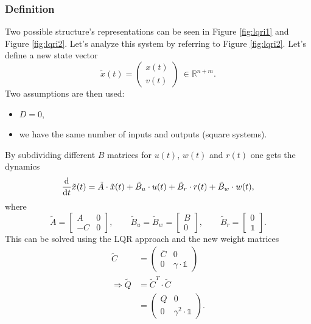 \documentclass[a4paper,12 pt]{article}
\numberwithin{equation}{section}
\theoremstyle{definition}
\theoremstyle{remark}
\theoremstyle{definition}
\theoremstyle{definition}
\theoremstyle{definition}
\theoremstyle{remark}
\begin{document}
\subsubsection*{Definition} Two possible structure's representations can be seen in Figure \ref{fig:lqri1} and Figure \ref{fig:lqri2}. Let's analyze this system by referring to Figure \ref{fig:lqri2}. Let's define a new state vector 
\begin{equation}
\tilde{x}(t)=\begin{pmatrix} x(t) \\ v(t) \end{pmatrix} \ \in \mathbb{R}^{n+m}.
\end{equation}
Two assumptions are then used:
\begin{itemize}
\item $D=0$,
\item we have the same number of inputs and outputs (square systems).
\end{itemize}
By subdividing different $B$ matrices for $u(t)$, $w(t)$ and $r(t)$ one gets the dynamics
\begin{equation}
\frac{\text d}{\text{d}t}\tilde x(t)=\tilde A \cdot \tilde x(t)+ \tilde B_u\cdot u(t)+\tilde B_r \cdot r(t)+\tilde B_w \cdot w(t),
\end{equation}
where
\begin{equation}
\tilde A=\begin{bmatrix} A & 0 \\ -C & 0 \end{bmatrix}, \qquad
\tilde B_u=\tilde B_w=\begin{bmatrix} B \\ 0 \end{bmatrix}, \qquad 
\tilde B_r=\begin{bmatrix} 0 \\ \mathbb{1} \end{bmatrix}.
\end{equation}
This can be solved using the LQR approach and the new weight matrices
\begin{equation}
\begin{split}
\tilde{C}&=\begin{pmatrix} \bar{C}&0\\ 0&\gamma \cdot \mathbb{1} \end{pmatrix}\\
\Rightarrow \tilde{Q}&=\tilde{C}^T\cdot \tilde{C}\\
&=\begin{pmatrix}
Q&0\\
0&\gamma^2 \cdot \mathbb{1}
\end{pmatrix}.
\end{split}
\end{equation}
\end{document}

